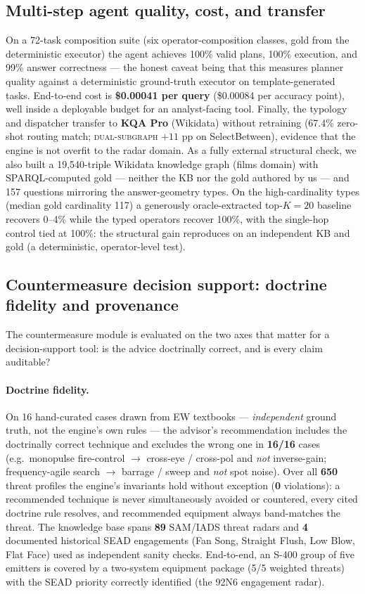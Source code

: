 \documentclass[review]{elsarticle}
\newcommand{\op}[1]{\textsc{\small #1}}
\begin{document}
\subsection{Multi-step agent quality, cost, and transfer}
On a 72-task composition suite (six operator-composition classes, gold from the
deterministic executor) the agent achieves 100\% valid plans, 100\% execution,
and 99\% answer correctness --- the honest caveat being that this measures
planner quality against a deterministic ground-truth executor on
template-generated tasks. End-to-end cost is \textbf{\$0.00041 per query}
(\$0.00084 per accuracy point), well inside a deployable budget for an
analyst-facing tool. Finally, the typology and dispatcher transfer to
\textbf{KQA Pro} \citep{cao2022kqapro} (Wikidata) without retraining (67.4\%
zero-shot routing match; \op{dual-subgraph} $+11$ pp on SelectBetween),
evidence that the engine is not overfit to the radar domain. As a fully
external structural check, we also built a 19{,}540-triple Wikidata knowledge
graph (films domain) with SPARQL-computed gold --- neither the KB nor the gold
authored by us --- and 157 questions mirroring the answer-geometry types. On
the high-cardinality types (median gold cardinality 117) a generously
oracle-extracted top-$K{=}20$ baseline recovers 0--4\% while the typed operators
recover 100\%, with the single-hop control tied at 100\%: the structural gain
reproduces on an independent KB and gold (a deterministic, operator-level test).

\subsection{Countermeasure decision support: doctrine fidelity and provenance}
\label{sec:eval-ew}
The countermeasure module is evaluated on the two axes that matter for a
decision-support tool: is the advice doctrinally correct, and is every claim
auditable?

\paragraph{Doctrine fidelity.} On 16 hand-curated cases drawn from EW textbooks
--- \emph{independent} ground truth, not the engine's own rules --- the
advisor's recommendation includes the doctrinally correct technique and excludes
the wrong one in \textbf{16/16} cases (e.g.\ monopulse fire-control $\to$
cross-eye / cross-pol and \emph{not} inverse-gain; frequency-agile search $\to$
barrage / sweep and \emph{not} spot noise). Over all \textbf{650} threat
profiles the engine's invariants hold without exception (\textbf{0} violations):
a recommended technique is never simultaneously avoided or countered, every
cited doctrine rule resolves, and recommended equipment always band-matches the
threat. The knowledge base spans \textbf{89} SAM/IADS threat radars and
\textbf{4} documented historical SEAD engagements (Fan Song, Straight Flush, Low
Blow, Flat Face) used as independent sanity checks. End-to-end, an S-400 group
of five emitters is covered by a two-system equipment package (5/5 weighted
threats) with the SEAD priority correctly identified (the 92N6 engagement
radar).
\end{document}
